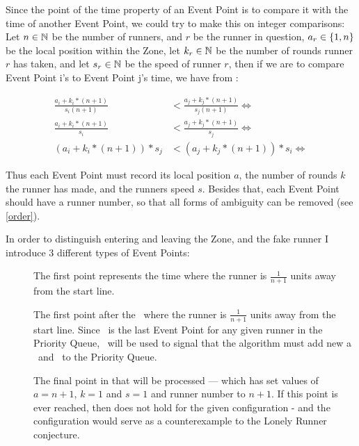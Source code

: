 Since the point of the time property of an Event Point is to compare it with the time of another Event Point, we could try to make this on integer comparisons: Let $n \in \mathbb{N}$ be the number of runners, and $r$ be the runner in question, $a_r \in \{1, n\}$ be the local position within the Zone, let $k_r \in \mathbb{N}$ be the number of rounds runner $r$ has taken, and let $s_r \in \mathbb{N}$ be the speed of runner $r$, then if we are to compare Event Point i's to Event Point j's time, we have from :
  
\begin{equation}
\label{eqa:integerTime}
\begin{split}
\frac{a_i + k_i * (n+1)}{s_i (n+1)} &< \frac{a_j + k_j * (n+1)}{s_j (n+1)} \Leftrightarrow\\
\frac{a_i + k_i * (n+1)}{s_i} &< \frac{a_j + k_j * (n+1)}{s_j} \Leftrightarrow\\
(a_i + k_i * (n+1)) * s_j &< (a_j + k_j * (n+1)) * s_i \Leftrightarrow
\end{split}
\end{equation}

Thus each Event Point must record its local position $a$, the number of rounds $k$ the runner has made, and the runners speed $s$. Besides that, each Event Point should have a runner number, so that all forms of ambiguity can be removed (see \ref{order}).

In order to distinguish entering and leaving the Zone, and the fake runner I introduce 3 different types of Event Points:
\begin{description}
\item[\comStart] The first point represents the time where the runner is $\frac{1}{n + 1}$ units away from the start line.
\item[\comEnd] The first point after the \comStart\, where the runner is $\frac{1}{n + 1}$ units away from the start line. Since \comEnd\, is the last Event Point for any given runner in the Priority Queue, \comEnd\, will be used to signal that the algorithm must add new a \comStart\, and \comEnd\ to the Priority Queue.
\item[\comFin] The final point in that will be processed --- which has set values of $a = n+1$, $k = 1$ and $s = 1$ and runner number to $n+1$. If this point is ever reached, then  does not hold for the given configuration - and the configuration would serve as a counterexample to the Lonely Runner conjecture.
\end{description}

